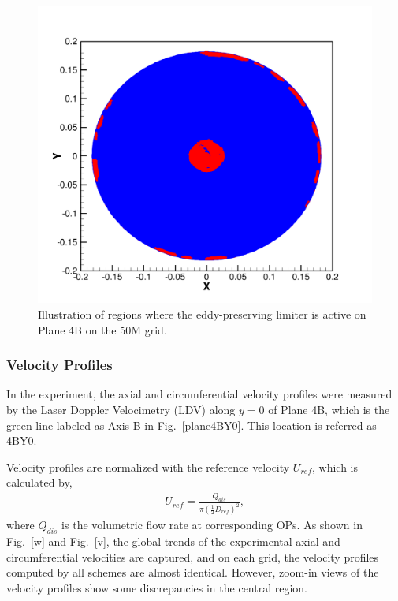 \begin{figure}[t]
\centering
   \includegraphics[clip=true, trim= 1.5cm 1.5cm 3.0cm 3.0cm,width=0.99\linewidth]{./figures/bulbt/ivort} 
   \caption{Illustration of regions where the eddy-preserving limiter is active on Plane 4B on the 50M grid.}
   \label{ivort}
\end{figure}
\subsubsection{Velocity Profiles}
In the experiment, the axial and circumferential velocity profiles were measured by the Laser Doppler Velocimetry (LDV) along $y=0$ of Plane 4B, which is the green line labeled as Axis B in Fig.~\ref{plane4BY0}. This location is referred as 4BY0.

Velocity profiles are normalized with the reference velocity $U_{ref}$, which is calculated by,
\begin{align} 
   U_{ref} = \frac{Q_{dis}}{\pi (\frac{1}{2}D_{ref})^2},
\end{align}
where $Q_{dis}$ is the volumetric flow rate at corresponding OPs.
As shown in Fig.~\ref{w} and Fig.~\ref{v}, the global trends of the experimental axial and circumferential velocities are captured, and on each grid, the velocity profiles computed by all schemes are almost identical. However, zoom-in views of the velocity profiles show some discrepancies in the central region. 

